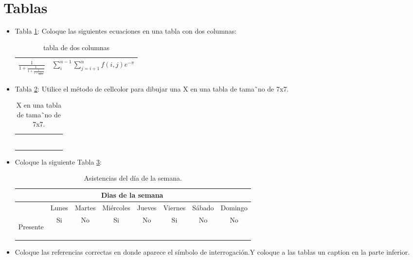 \documentclass{article}
\begin{document}
\section{Tablas}
 \begin{itemize}
 
	\item Tabla \ref{table:columnas}: Coloque las siguientes ecuaciones en una tabla con dos columnas:
		\begin{table}[h!]
		\centering
			\begin{tabular}{|c|c|}\hline
	

			$\displaystyle \frac{1}{1+\frac{1}{1+\frac{1}{1+\frac{1}{1+...}}}}$ & $\displaystyle \sum _{i}^{n-1}\sum _{j=i+1}^{n} f(i,j)e^{-\pi}$ \\\hline

			\end{tabular}	
		\caption{tabla de dos columnas}\label{table:columnas}
		\end{table}
	
	\item Tabla \ref{table:x}: Utilice el método de cellcolor para dibujar una X en una tabla de tama˜no de 7x7.
		\begin{table}[h!]
		\centering
			\begin{tabular}{|c|c|c|c|c|c|c|}\hline
			\cellcolor[gray]{0} &&&&&&\cellcolor[gray]{0}\\\hline
			&\cellcolor[gray]{0}&&&&\cellcolor[gray]{0}&\\\hline
			&&\cellcolor[gray]{0}&&\cellcolor[gray]{0}&&\\\hline
			&&&\cellcolor[gray]{0}&&&\\\hline
			&&\cellcolor[gray]{0}&&\cellcolor[gray]{0}&&\\\hline
			&\cellcolor[gray]{0}&&&&\cellcolor[gray]{0}&\\\hline
			\cellcolor[gray]{0}&&&&&&\cellcolor[gray]{0}\\\hline
			\end{tabular}	
		\caption{X en una tabla de tama˜no de 7x7.}\label{table:x}
		\end{table}
	
	\item Coloque la siguiente Tabla \ref{table:semana}:
		\begin{table}[h!]
		\centering
			\begin{tabular}{|c|c|c|c|c|c|c|c|}\hline
				&\multicolumn{6}{c}{Dias de la semana}&\\\hline
				&Lunes&Martes&Miércoles&Jueves&Viernes&Sábado&Domingo\\\hline
				\begin{sideways}Presente\end{sideways}&Si&No&Si&No&Si&No&No \\\hline
			\end{tabular}	
		\caption{Asistencias del día de la semana.}\label{table:semana}
		\end{table}
	\item Coloque las referencias correctas en donde aparece el símbolo de interrogación.Y coloque a las tablas un caption
en la parte inferior.

 \end{itemize}
\pagebreak
\end{document}
